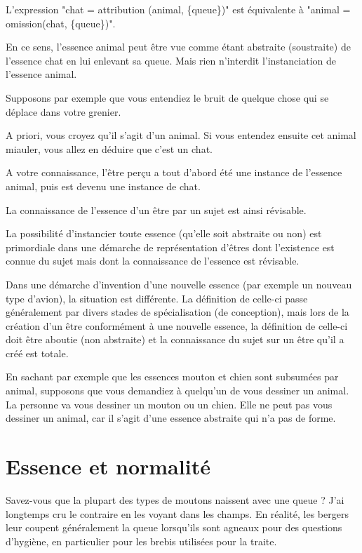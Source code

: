 \documentclass[a4paper, 12pt, openright, french]{book}
\begin{document}
L'expression "chat = attribution (animal, \{queue\})"
est équivalente à "animal = omission(chat, \{queue\})".

En ce sens, l'essence animal peut être vue comme étant
abstraite (soustraite) de l'essence chat en lui enlevant
sa queue. Mais rien n'interdit
l'instanciation de l'essence animal.

Supposons par exemple que vous entendiez le bruit de quelque chose qui
se déplace dans votre grenier.

A priori, vous croyez qu'il s'agit
d'un animal. Si vous entendez ensuite cet animal
miauler, vous allez en déduire que c'est un chat.

A votre connaissance, l'être perçu a tout
d'abord été une instance de l'essence
animal, puis est devenu une instance de chat.

La connaissance de l'essence d'un être
par un sujet est ainsi révisable.

La possibilité d'instancier toute essence
(qu'elle soit abstraite ou non) est primordiale dans une
démarche de représentation d'êtres dont
l'existence est connue du sujet mais dont la
connaissance de l'essence est révisable.

Dans une démarche d'invention d'une
nouvelle essence (par exemple un nouveau type d'avion),
la situation est différente. La définition de celle-ci passe
généralement par divers stades de spécialisation (de conception), mais
lors de la création d'un être conformément à une
nouvelle essence, la définition de celle-ci doit être aboutie (non
abstraite) et la connaissance du sujet sur un être qu'il
a créé est totale.

En sachant par exemple que les essences mouton et chien sont subsumées
par animal, supposons que vous demandiez à quelqu'un de
vous dessiner un animal. La personne va vous dessiner un mouton ou un
chien. Elle ne peut pas vous dessiner un animal, car il
s'agit d'une essence abstraite qui
n'a pas de forme.

\section{Essence et normalité}

Savez-vous que la plupart des types de moutons naissent avec une queue ?
J'ai longtemps cru le contraire en les voyant dans les
champs. En réalité, les bergers leur coupent généralement la queue
lorsqu'ils sont agneaux pour des questions d'hygiène, en
particulier pour les brebis utilisées pour la traite.
\end{document}
